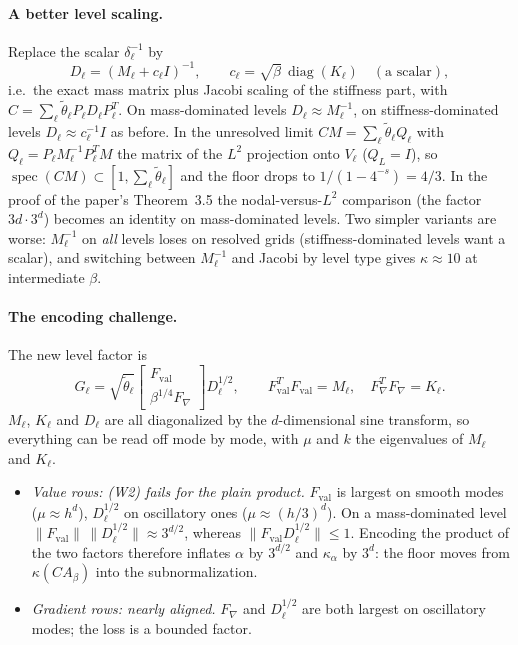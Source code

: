 \documentclass[11pt,a4paper]{article}
\begin{document}
\paragraph{A better level scaling.} Replace the scalar $\delta_\ell^{-1}$ by
\[
D_\ell=(M_\ell+c_\ell I)^{-1},\qquad c_\ell=\sqrt\beta\,\operatorname{diag}(K_\ell)\quad(\text{a scalar}),
\]
i.e.\ the exact mass matrix plus Jacobi scaling of the stiffness part, with
$C=\sum_\ell\tilde\theta_\ell P_\ell D_\ell P_\ell^T$. On mass-dominated levels $D_\ell\approx M_\ell^{-1}$, on
stiffness-dominated levels $D_\ell\approx c_\ell^{-1}I$ as before. In the unresolved limit
$CM=\sum_\ell\tilde\theta_\ell Q_\ell$ with $Q_\ell=P_\ell M_\ell^{-1}P_\ell^TM$ the matrix of the $L^2$
projection onto $V_\ell$ ($Q_L=I$), so $\operatorname{spec}(CM)\subset[1,\sum_\ell\tilde\theta_\ell]$ and the floor
drops to $1/(1-4^{-s})=4/3$. In the proof of the paper's Theorem~3.5 the
nodal-versus-$L^2$ comparison (the factor $3d\cdot3^d$) becomes an identity on
mass-dominated levels. Two simpler variants are worse: $M_\ell^{-1}$ on
\emph{all} levels loses on resolved grids (stiffness-dominated levels want a
scalar), and switching between $M_\ell^{-1}$ and Jacobi by level type gives
$\kappa\approx10$ at intermediate $\beta$.

\paragraph{The encoding challenge.} The new level factor is
\[
G_\ell=\sqrt{\tilde\theta_\ell}\begin{bmatrix}F_{\mathrm{val}}\\ \beta^{1/4}F_\nabla\end{bmatrix}D_\ell^{1/2},\qquad
F_{\mathrm{val}}^TF_{\mathrm{val}}=M_\ell,\quad F_\nabla^TF_\nabla=K_\ell .
\]
$M_\ell$, $K_\ell$ and $D_\ell$ are all diagonalized by the $d$-dimensional sine transform,
so everything can be read off mode by mode, with $\mu$ and $k$ the eigenvalues
of $M_\ell$ and $K_\ell$.
\begin{itemize}
\item \emph{Value rows: (W2) fails for the plain product.} $F_{\mathrm{val}}$ is largest on
  smooth modes ($\mu\approx h^d$), $D_\ell^{1/2}$ on oscillatory ones ($\mu\approx(h/3)^d$). On a
  mass-dominated level $\|F_{\mathrm{val}}\|\,\|D_\ell^{1/2}\|\approx3^{d/2}$, whereas
  $\|F_{\mathrm{val}}D_\ell^{1/2}\|\le1$. Encoding the product of the two factors
  therefore inflates $\alpha$ by $3^{d/2}$ and $\kappa_\alpha$ by $3^d$: the floor moves from
  $\kappa(CA_\beta)$ into the subnormalization.
\item \emph{Gradient rows: nearly aligned.} $F_\nabla$ and $D_\ell^{1/2}$ are both largest on
  oscillatory modes; the loss is a bounded factor.
\end{itemize}
\end{document}

